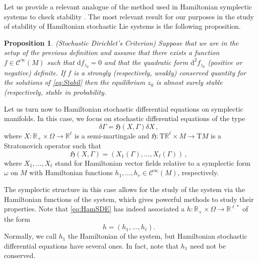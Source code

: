 \documentclass[11pt]{article}
\theoremstyle{plain}
\newtheorem{proposition}[theorem]{Proposition}
\theoremstyle{definition}
\newtheorem{definition}[theorem]{Definition}
\renewcommand{\d}{\mathrm{d}}
\newcommand{\Cinfty}{\mathscr{C}^\infty}
\newcommand{\T}{\mathrm{T}}
\def\d{\mathrm{d}}
\begin{document}
Let us provide a relevant analogue of the method used in Hamiltonian symplectic systems to check stability \cite{AM78}.
The most relevant result for our purposes in the study of stability of Hamiltonian stochastic Lie systems is the following proposition. 
\begin{proposition} (Stochastic Dirichlet’s Criterion) Suppose that we are in the setup of the previous definition and assume that there exists a function $f\in \Cinfty(M)$ such that $\d f_{z_0} = 0$ and that the
quadratic form $\d^2f_{z_0}$  (positive or negative) definite. If $f$ is a strongly (respectively, weakly) conserved quantity for the solutions of \eqref{eq:Stabil} then the equilibrium $z_0$ is almost surely stable (respectively,
stable in probability.
\end{proposition}

Let us turn now to Hamiltonian stochastic differential equations on symplectic manifolds. In this case, we focus on stochastic differential equations of the type
\begin{equation}\label{eq:HamSDE}
\delta  \Gamma=\mathfrak{H}(X,\Gamma )\delta X\,,
\end{equation}
where $X:\mathbb{R}_+\times \Omega\rightarrow \mathbb{R}^\ell$ is a semi-martingale and $\mathfrak{H}:\T \mathbb{R}^\ell\times M\rightarrow \T M$ is a Stratonovich operator such that
$$
\mathfrak{H}(X,\Gamma)=(X_1(\Gamma),\ldots,X_\ell(\Gamma))\,, 
$$
where $X_1,\ldots,X_\ell$ stand for Hamiltonian vector fields relative to a symplectic form $\omega$ on $M$ with Hamiltonian functions $h_1,\ldots,h_r\in \Cinfty(M)$, respectively. 

The symplectic structure in this case allows for the study of the system via the Hamiltonian functions of the system, which gives powerful methods to study their properties. Note that \eqref{eq:HamSDE} has indeed associated a $h:\mathbb{R}_+\times \Omega\rightarrow \mathbb{R}^{\ell*}$ of the form
$$
h=(h_1,\ldots,h_\ell).
$$
Normally, we call $h_1$ the Hamiltonian of the system, but Hamiltonian stochastic differential equations have several ones. In fact, note that $h_1$ need not be conserved.
\end{document}
